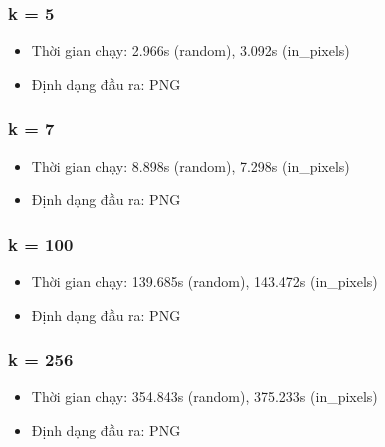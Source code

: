 \documentclass{article}
\begin{document}
\subsubsection{k = 5}
\begin{itemize}
  \item Thời gian chạy: 2.966s (random), 3.092s (in\_pixels)
  \item Định dạng đầu ra: PNG
\end{itemize}
\subsubsection{k = 7}
\begin{itemize}
  \item Thời gian chạy: 8.898s (random), 7.298s (in\_pixels)
  \item Định dạng đầu ra: PNG
\end{itemize}
\subsubsection{k = 100}
\begin{itemize}
  \item Thời gian chạy: 139.685s (random), 143.472s (in\_pixels)
  \item Định dạng đầu ra: PNG
\end{itemize}
\subsubsection{k = 256}
\begin{itemize}
  \item Thời gian chạy: 354.843s (random), 375.233s (in\_pixels)
  \item Định dạng đầu ra: PNG
\end{itemize}

\newpage
\end{document}
